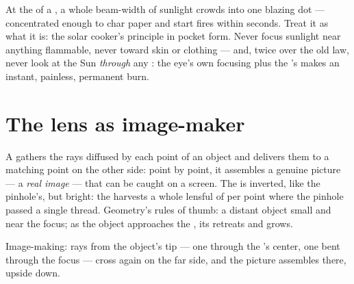 \begin{remark}\label{rem:g8:lenses-images:burning}
At the  of a , a whole beam-width of
sunlight crowds into one blazing dot --- concentrated enough
to char paper and start fires within seconds. Treat it as
what it is: the solar cooker's principle in pocket form.
Never focus sunlight near anything flammable, never toward
skin or clothing --- and, twice over the old law, never look
at the Sun \emph{through} any : the eye's own focusing
plus the 's makes an instant, painless, permanent burn.
\end{remark}

\section{The lens as image-maker}

\begin{proposition}\label{prop:g8:lenses-images:realimage}
A  gathers the rays diffused by each point of
an object and delivers them to a matching point on the other
side: point by point, it assembles a genuine picture --- a
\emph{real image} --- that can be caught on
a screen. The  is inverted, like the pinhole's, but
bright: the  harvests a whole lensful of  per point
where the pinhole passed a single thread. Geometry's rules of
thumb: a distant object  small and near the focus; as
the object approaches the , its  retreats and
grows.
\end{proposition}

\begin{omfigure}

{\small Image-making: rays from the object's tip --- one
through the 's center, one bent through the focus ---
cross again on the far side, and the picture assembles there,
upside down.}
\end{omfigure}

